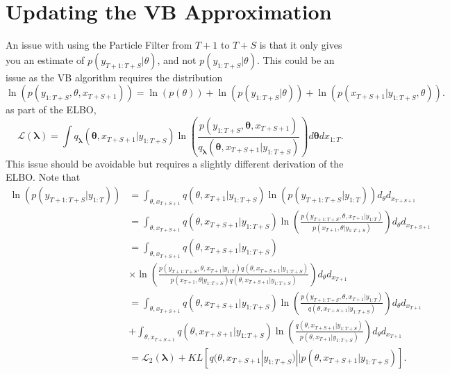 \documentclass[12pt,a4paper]{article}%
\begin{document}
\section{Updating the VB Approximation}

An issue with using the Particle Filter from $T+1$ to $T+S$ is that it only gives you an estimate of $p(y_{T+1:T+S} | \theta)$, and not $p(y_{1:T+S} | \theta)$. This could be an issue as the VB algorithm requires the distribution
\begin{equation}
\label{VBPF}
\ln(p(y_{1:T+S}, \theta, x_{T+S+1})) = \ln(p(\theta)) + \ln(p(y_{1:T+S} | \theta)) + \ln(p(x_{T+S+1} | y_{1:T+S}, \theta)).
\end{equation}
as part of the ELBO,
\begin{equation}
\label{ELBO}
\mathcal{L}(\boldsymbol{\lambda}) = \int q_{\boldsymbol{\lambda}}(\boldsymbol{\theta}, x_{T+S+1} | y_{1:T+S}) \ln \left( \frac{p(y_{1:T+S},\boldsymbol{\theta}, x_{T+S+1})}{q_{\boldsymbol{\lambda}}(\boldsymbol{\theta}, x_{T+S+1} | y_{1:T+S})} \right) d\boldsymbol{\theta}dx_{1:T}.
\end{equation}
This issue should be avoidable but requires a slightly different derivation of the ELBO. Note that
\begin{align}
\ln(p(y_{T+1:T+S} | y_{1:T})) &= \int_{\theta, x_{T+S+1}} q(\theta, x_{T+1} | y_{1:T+S}) \ln(p(y_{T+1:T+S} | y_{1:T})) d_{\theta} d_{x_{T+S+1}} \nonumber \\
&= \int_{\theta, x_{T+S+1}} q(\theta, x_{T+S+1}| y_{1:T+S}) \ln \left(\frac{p(y_{T+1:T+S}, \theta, x_{T+1} | y_{1:T})}{p(x_{T+1}, \theta | y_{1:T+S})} \right) d_{\theta} d_{x_{T+S+1}}\nonumber \\
&= \int_{\theta, x_{T+S+1}} q(\theta, x_{T+S+1}| y_{1:T+S}) \nonumber \\
&\times \ln \left( \frac{p(y_{T+1:T+S}, \theta, x_{T+1} | y_{1:T})q(\theta, x_{T+S+1}| y_{1:T+S})}
{p(x_{T+1}, \theta | y_{1:T+S})q(\theta, x_{T+S+1}| y_{1:T+S}) } \right) d_{\theta} d_{x_{T+1}}\nonumber \\
&= \int_{\theta, x_{T+S+1}} q(\theta, x_{T+S+1}| y_{1:T+S}) \ln \left(\frac{p(y_{T+1:T+S}, \theta, x_{T+1} | y_{1:T})}{q(\theta, x_{T+S+1}| y_{1:T+S})} \right) d_{\theta} d_{x_{T+1}} \label{ELBOv2}\\
&+  \int_{\theta, x_{T+S+1}} q(\theta, x_{T+S+1}| y_{1:T+S}) \ln \left(\frac{q(\theta, x_{T+S+1}| y_{1:T+S})}{p(\theta, x_{T+1} | y_{1:T+S})} \right) d_{\theta} d_{x_{T+1}} \label{KL} \\
&= \mathcal{L}_2(\boldsymbol{\lambda}) + KL[q(\theta, x_{T+S+1} | y_{1:T+S}) || p(\theta, x_{T+S+1} | y_{1:T+S})]. \nonumber
\end{align}
\end{document}
